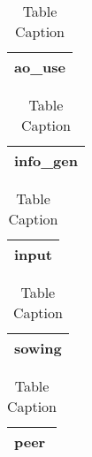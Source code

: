 \documentclass[12pt]{article}
\begin{document}
{\normalsize 
\begin{table}[tbp]
{\normalsize \centering
\begin{tabular}{|l|}
\hline
\textbf{ao\_use} \\ \hline
\end{tabular}
}
\caption{Table Caption}
\label{ao_use}
\end{table}
}

{\normalsize 
\begin{table}[tbp]
{\normalsize \centering
\begin{tabular}{|l|}
\hline
\textbf{info\_gen} \\ \hline
\end{tabular}
}
\caption{Table Caption}
\label{info_gen}
\end{table}
}

{\normalsize 
\begin{table}[tbp]
{\normalsize \centering
\begin{tabular}{|l|}
\hline
\textbf{input} \\ \hline
\end{tabular}
}
\caption{Table Caption}
\label{input}
\end{table}
}

{\normalsize 
\begin{table}[tbp]
{\normalsize \centering
\begin{tabular}{|l|}
\hline
\textbf{sowing} \\ \hline
\end{tabular}
}
\caption{Table Caption}
\label{sowing}
\end{table}
}


{\normalsize 
\begin{table}[tbp]
{\normalsize \centering
\begin{tabular}{|l|}
\hline
\textbf{peer} \\ \hline
\end{tabular}
}
\caption{Table Caption}
\label{peer}
\end{table}
}
\end{document}
